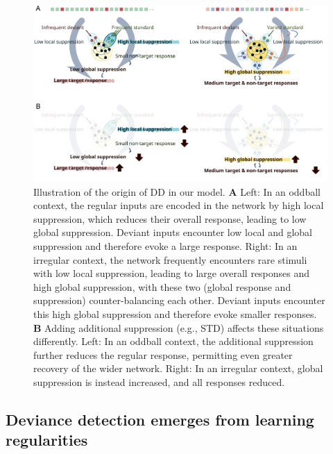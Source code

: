 \documentclass[9pt,lineno,onehalfspacing]{elife}
\begin{document}
\begin{figure}
    \includegraphics[width=\linewidth]{fig-conclusion}
    \caption{%
        Illustration of the origin of DD in our model.
        \textbf{A} Left: In an oddball context, the regular inputs are encoded in the network by high local suppression, which reduces their overall response, leading to low global suppression. Deviant inputs encounter low local and global suppression and therefore evoke a large response. Right: In an irregular context, the network frequently encounters rare stimuli with low local suppression, leading to large overall responses and high global suppression, with these two (global response and suppression) counter-balancing each other. Deviant inputs encounter this high global suppression and therefore evoke smaller responses.
        \textbf{B} Adding additional suppression (e.g., STD) affects these situations differently. Left: In an oddball context, the additional suppression further reduces the regular response, permitting even greater recovery of the wider network. Right: In an irregular context, global suppression is instead increased, and all responses reduced.
    }
    \label{fig:conclusion}
\end{figure}

\subsection{Deviance detection emerges from learning regularities}
\end{document}
